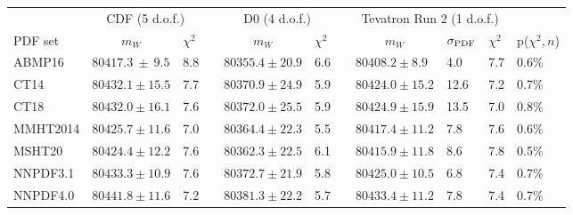 
\begin{tabular*}{\linewidth}{l @{\extracolsep{\fill}}llllllllll}
\hline \hline
   & \multicolumn{2}{c}{CDF (5 d.o.f.)} & & \multicolumn{2}{c}{D0 (4 d.o.f.)} & & \multicolumn{3}{c}{Tevatron Run 2 (1 d.o.f.)} \\
PDF set   & \multicolumn{1}{c}{$m_W$}   & $\chi^2$ & & \multicolumn{1}{c}{$m_W$} & $\chi^2$ & & \multicolumn{1}{c}{$m_W$} & $\sigma_{\scriptsize\textrm{PDF}}$ & $\chi^2$ & p($\chi^2,n$) \\
\hline
   ABMP16 & $80417.3~\pm~9.5$  &  8.8  & & $80355.4 \pm 20.9$ &  6.6   & & $80408.2 \pm  8.9$ &   4.0 &      7.7  & 0.6\% \\
     CT14 & $80432.1 \pm 15.5$ &  7.7  & & $80370.9 \pm 24.9$ &  5.9   & & $80424.0 \pm 15.2$ &  12.6 &      7.2  & 0.7\% \\
     CT18 & $80432.0 \pm 16.1$ &  7.6  & & $80372.0 \pm 25.5$ &  5.9   & & $80424.9 \pm 15.9$ &  13.5 &      7.0  & 0.8\% \\
 MMHT2014 & $80425.7 \pm 11.6$ &  7.0  & & $80364.4 \pm 22.3$ &  5.5   & & $80417.4 \pm 11.2$ &   7.8 &      7.6  & 0.6\% \\
   MSHT20 & $80424.4 \pm 12.2$ &  7.6  & & $80362.3 \pm 22.5$ &  6.1   & & $80415.9 \pm 11.8$ &   8.6 &      7.8  & 0.5\% \\
 NNPDF3.1 & $80433.3 \pm 10.9$ &  7.6  & & $80372.7 \pm 21.9$ &  5.8   & & $80425.0 \pm 10.5$ &   6.8 &      7.4  & 0.7\% \\
 NNPDF4.0 & $80441.8 \pm 11.6$ &  7.2  & & $80381.3 \pm 22.2$ &  5.7   & & $80433.4 \pm 11.2$ &   7.8 &      7.4  & 0.7\% \\
\hline \hline 
\end{tabular*}
